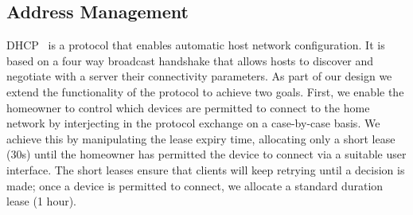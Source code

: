 




\subsection{Address Management}
\label{s:addresses}

DHCP~\cite{rfc:2131} is a protocol that enables automatic host network
configuration. It is based on a four way broadcast handshake that
allows hosts to discover and negotiate with a server their
connectivity parameters.  As part of our design we extend the
functionality of the protocol to achieve two goals.  First, we enable
the homeowner to control which devices are permitted to connect to the
home network by interjecting in the protocol exchange on a
case-by-case basis.  We achieve this by manipulating the lease expiry
time, allocating only a short lease (30s) until the
homeowner has permitted the device to connect via a suitable user
interface.  The short leases ensure that clients will keep retrying
until a decision is made; once a device is permitted to connect, we
allocate a standard duration lease (1 hour).

